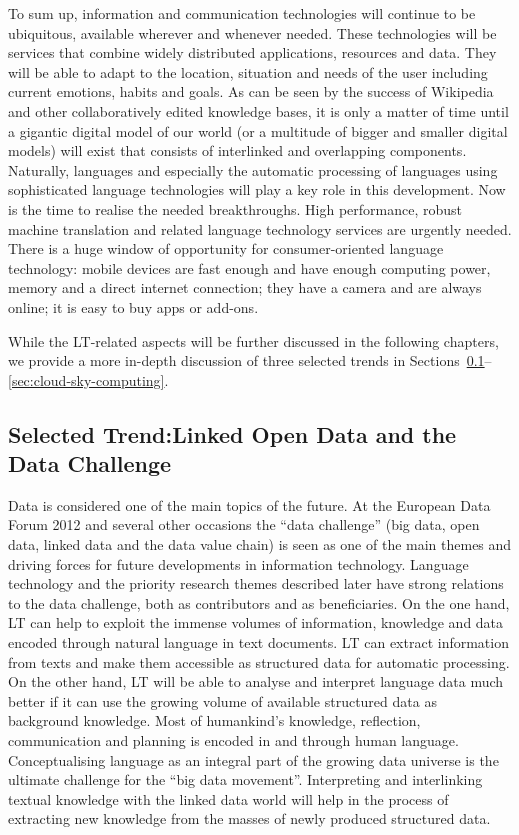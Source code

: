 \documentclass[10pt, plain]{../../metanetpaper}
\begin{document}
\begin{multicols}{2}
To sum up, information and communication technologies will continue to be ubiquitous, available wherever and whenever needed. These technologies will be services that combine widely distributed applications, resources and data. They will be able to adapt to the location, situation and needs of the user including current emotions, habits and goals. As can be seen by the success of Wikipedia and other collaboratively edited knowledge bases, it is only a matter of time until a gigantic digital model of our world (or a multitude of bigger and smaller digital models) will exist that consists of interlinked and overlapping components. Naturally, languages and especially the automatic processing of languages using sophisticated language technologies will play a key role in this development. Now is the time to realise the needed breakthroughs. High performance, robust machine translation and related language technology services are urgently needed. There is a huge window of opportunity for consumer-oriented language technology: mobile devices are fast enough and have enough computing power, memory and a direct internet connection; they have a camera and are always online; it is easy to buy apps or add-ons.

While the LT-related aspects will be further discussed in the following chapters, we provide a more in-depth discussion of three selected trends in Sections~\ref{sec:linked-data-open}--\ref{sec:cloud-sky-computing}.

\subsection[Selected Trend: Linked Open Data and the Data Challenge]{Selected Trend:\newline Linked Open Data and the Data Challenge}
\label{sec:linked-data-open}

Data is considered one of the main topics of the future. At the European Data Forum 2012 and several other occasions the ``data challenge'' (big data, open data, linked data and the data value chain) is seen as one of the main themes and driving forces for future developments in information technology. Language technology and the priority research themes described later have strong relations to the data challenge, both as contributors and as beneficiaries. On the one hand, LT can help to exploit the immense volumes of information, knowledge and data encoded through natural language in text documents. LT can extract information from texts and make them accessible as structured data for automatic processing. On the other hand, LT will be able to analyse and interpret language data much better if it can use the growing volume of available structured data as background knowledge. 
%
Most of humankind's knowledge, reflection, communication and planning is encoded in and through human language. Conceptualising language as an integral part of the growing data universe is the ultimate challenge for the “big data movement”. Interpreting and interlinking textual knowledge with the linked data world will help in the process of extracting new knowledge from the masses of newly produced structured data.


\end{multicols}
\end{document}
